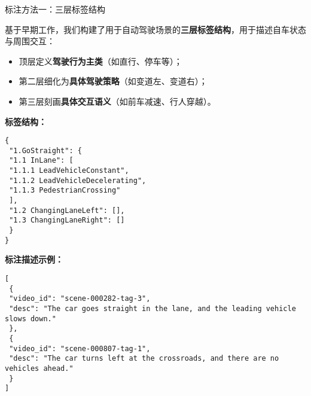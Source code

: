 \documentclass[serif]{beamer}
\begin{document}
\begin{frame}{标注方法一：三层标签结构}

基于早期工作，我们构建了用于自动驾驶场景的\textbf{三层标签结构}，用于描述自车状态与周围交互：

\begin{itemize}
  \item 顶层定义\textbf{驾驶行为主类}（如直行、停车等）；
  \item 第二层细化为\textbf{具体驾驶策略}（如变道左、变道右）；
  \item 第三层刻画\textbf{具体交互语义}（如前车减速、行人穿越）。
\end{itemize}

\vspace{0.4em}

\begin{minipage}[t]{0.48\textwidth}
\textbf{标签结构：}
\begin{flushleft}
\scriptsize\ttfamily
\noindent\texttt{\{}\\
\texttt{ \quad "1.GoStraight": \{}\\
\texttt{ \quad\quad "1.1 InLane": [}\\
\texttt{ \quad\quad\quad "1.1.1 LeadVehicleConstant",}\\
\texttt{ \quad\quad\quad "1.1.2 LeadVehicleDecelerating",}\\
\texttt{ \quad\quad\quad "1.1.3 PedestrianCrossing"}\\
\texttt{ \quad\quad ],}\\
\texttt{ \quad\quad "1.2 ChangingLaneLeft": [],}\\
\texttt{ \quad\quad "1.3 ChangingLaneRight": []}\\
\texttt{ \quad \}}\\
\texttt{\}}
\end{flushleft}
\end{minipage}
\hfill
\begin{minipage}[t]{0.48\textwidth}
\textbf{标注描述示例：}
\begin{flushleft}
\scriptsize\ttfamily
\noindent\texttt{[}\\
\texttt{ \quad \{}\\
\texttt{ \quad\quad "video\_id": "scene-000282-tag-3",}\\
\texttt{ \quad\quad "desc": "The car goes straight in the lane, and the leading vehicle slows down."}\\
\texttt{ \quad \},}\\
\texttt{ \quad \{}\\
\texttt{ \quad\quad "video\_id": "scene-000807-tag-1",}\\
\texttt{ \quad\quad "desc": "The car turns left at the crossroads, and there are no vehicles ahead."}\\
\texttt{ \quad \}}\\
\texttt{]}
\end{flushleft}
\end{minipage}

\end{frame}
\end{document}
